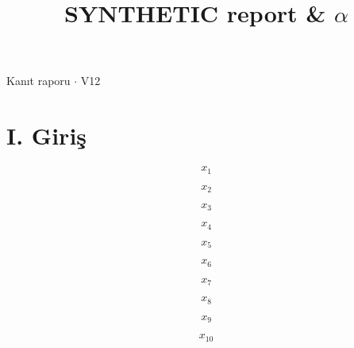 \documentclass[journal]{IEEEtran}
\begin{document}
\renewcommand{\abstractname}{Özet}
\renewcommand{\IEEEkeywordsname}{Dizin Terimleri}
\renewcommand{\refname}{Kaynaklar}

\title{SYNTHETIC report \& \ensuremath{\alpha}}

\maketitle

\noindent Kanıt raporu \ensuremath{\cdot} V12

\section*{I. Giriş}

\begin{equation}
\label{eq:EQ1}
x_{1}
\end{equation}
\cite{Synth26}

\begin{equation}
\label{eq:EQ2}
x_{2}
\end{equation}
\cite{Synth26}

\begin{equation}
\label{eq:EQ3}
x_{3}
\end{equation}
\cite{Synth26}

\begin{equation}
\label{eq:EQ4}
x_{4}
\end{equation}
\cite{Synth26}

\begin{equation}
\label{eq:EQ5}
x_{5}
\end{equation}
\cite{Synth26}

\begin{equation}
\label{eq:EQ6}
x_{6}
\end{equation}
\cite{Synth26}

\begin{equation}
\label{eq:EQ7}
x_{7}
\end{equation}
\cite{Synth26}

\begin{equation}
\label{eq:EQ8}
x_{8}
\end{equation}
\cite{Synth26}

\begin{equation}
\label{eq:EQ9}
x_{9}
\end{equation}
\cite{Synth26}

\begin{equation}
\label{eq:EQ10}
x_{10}
\end{equation}
\cite{Synth26}
\end{document}
